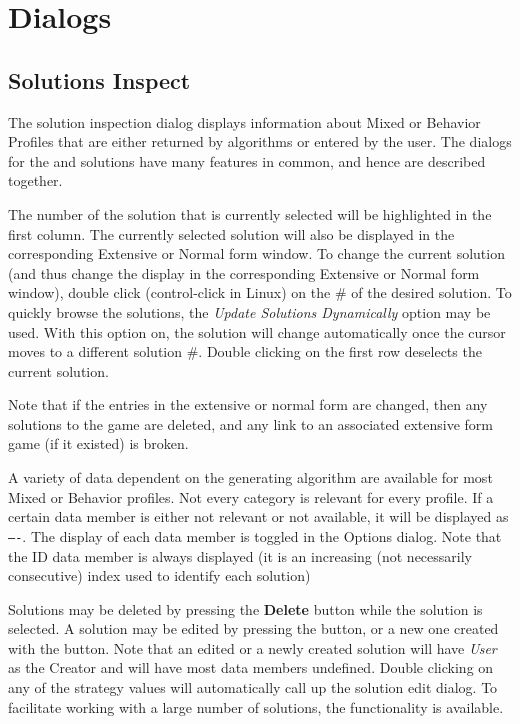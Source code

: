 \section{Dialogs}\label{GUIDialogs}

\subsection{Solutions Inspect}\label{SolutionInspect}

The solution inspection dialog displays information about Mixed or
Behavior Profiles that are either returned by algorithms or entered by 
the user.  The dialogs for the  and  solutions have many features in common,
and hence are described together.

The number of the solution that is currently selected will be
highlighted in the first column.  The currently selected solution will
also be displayed in the corresponding Extensive or Normal form
window.  To change the current solution (and thus change the display
in the corresponding Extensive or Normal form window), double click
(control-click in Linux) on the \# of the desired solution.  To
quickly browse the solutions, the {\em Update Solutions Dynamically} 
option may be used.  With this option on, the solution will change
automatically once the cursor moves to a different solution \#.
Double clicking on the first row deselects the current solution.

Note that if the entries in the extensive or normal form are changed,
then any solutions to the game are deleted, and any link to an
associated extensive form game (if it existed) is broken.

A variety of data dependent on the generating algorithm are available
for most Mixed or Behavior profiles. Not every category is relevant
for every profile.  If a certain data member is either not relevant or
not available, it will be displayed as {\tt ----}.  The display of
each data member is toggled in the Options dialog.  Note that the ID
data member is always displayed (it is an increasing (not necessarily
consecutive) index used to identify each solution)

Solutions may be deleted by pressing the {\bf Delete} button while the
solution is selected.  A solution may be edited by pressing the 
 button, or a new one created with the 
 button.  Note that an edited or a newly
created solution will have {\em User} as the Creator and will have
most data members undefined.  Double clicking on any of the strategy
values will automatically call up the solution edit dialog.  To
facilitate working with a large number of solutions, the 
 functionality is available.

